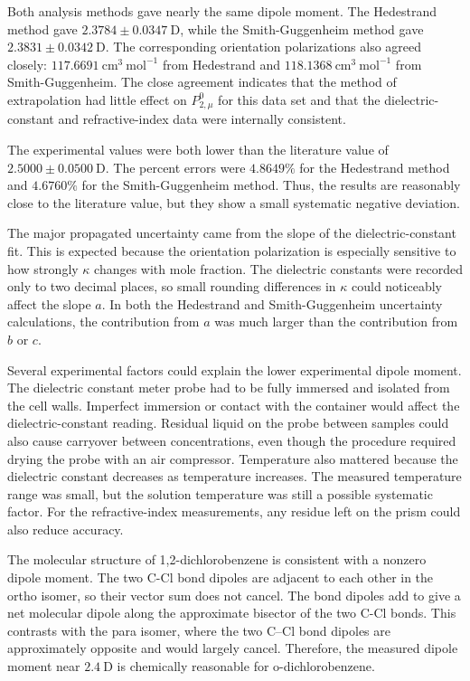 \documentclass[11pt]{article}
\begin{document}
Both analysis methods gave nearly the same dipole moment. The Hedestrand method gave $2.3784\pm0.0347\ \mathrm{D}$, while the Smith-Guggenheim method gave $2.3831\pm0.0342\ \mathrm{D}$. The corresponding orientation polarizations also agreed closely: $117.6691\ \mathrm{cm^3\ mol^{-1}}$ from Hedestrand and $118.1368\ \mathrm{cm^3\ mol^{-1}}$ from Smith-Guggenheim. The close agreement indicates that the method of extrapolation had little effect on $P_{2,\mu}^0$ for this data set and that the dielectric-constant and refractive-index data were internally consistent.

The experimental values were both lower than the literature value of $2.5000\pm0.0500\ \mathrm{D}$. The percent errors were $4.8649\%$ for the Hedestrand method and $4.6760\%$ for the Smith-Guggenheim method. Thus, the results are reasonably close to the literature value, but they show a small systematic negative deviation.

The major propagated uncertainty came from the slope of the dielectric-constant fit. This is expected because the orientation polarization is especially sensitive to how strongly $\kappa$ changes with mole fraction. The dielectric constants were recorded only to two decimal places, so small rounding differences in $\kappa$ could noticeably affect the slope $a$. In both the Hedestrand and Smith-Guggenheim uncertainty calculations, the contribution from $a$ was much larger than the contribution from $b$ or $c$.

Several experimental factors could explain the lower experimental dipole moment. The dielectric constant meter probe had to be fully immersed and isolated from the cell walls. Imperfect immersion or contact with the container would affect the dielectric-constant reading. Residual liquid on the probe between samples could also cause carryover between concentrations, even though the procedure required drying the probe with an air compressor. Temperature also mattered because the dielectric constant decreases as temperature increases. The measured temperature range was small, but the solution temperature was still a possible systematic factor. For the refractive-index measurements, any residue left on the prism could also reduce accuracy.

The molecular structure of 1,2-dichlorobenzene is consistent with a nonzero dipole moment. The two C-Cl bond dipoles are adjacent to each other in the ortho isomer, so their vector sum does not cancel. The bond dipoles add to give a net molecular dipole along the approximate bisector of the two C-Cl bonds. This contrasts with the para isomer, where the two C--Cl bond dipoles are approximately opposite and would largely cancel. Therefore, the measured dipole moment near $2.4\ \mathrm{D}$ is chemically reasonable for o-dichlorobenzene.
\end{document}
